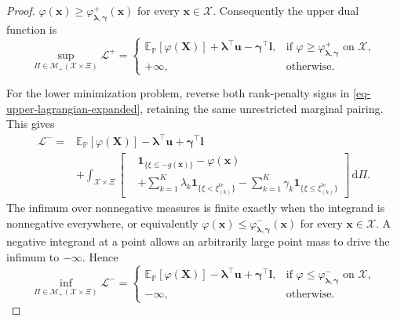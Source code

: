 \begin{proof}
  $\varphi(\bm x)\ge\varphi^+_{\bm\lambda,\bm\gamma}(\bm x)$ for every $\bm x\in\mathcal X$. Consequently the upper dual function is
  \begin{equation}
    \sup_{\Pi\in\mathcal M_+(\mathcal X\times\Xi)}\mathcal L^+
    =\begin{cases}
      \mathbb E_{\mathbb P}\left[\varphi(\bm X)\right]
        +\bm\lambda^\top\bm u-\bm\gamma^\top\bm l,
        &\text{if }\varphi\ge\varphi^+_{\bm\lambda,\bm\gamma}\text{ on }\mathcal X,\\
      +\infty,&\text{otherwise}.
    \end{cases}
    \label{eq-upper-dual-function}
  \end{equation}

  For the lower minimization problem, reverse both rank-penalty signs in \eqref{eq-upper-lagrangian-expanded}, retaining the same unrestricted marginal pairing. This gives
  \begin{equation}
    \begin{aligned}
      \mathcal L^-={}&\mathbb E_{\mathbb P}\left[\varphi(\bm X)\right]
        -\bm\lambda^\top\bm u+\bm\gamma^\top\bm l\\
      &+\int_{\mathcal X\times\Xi}\left[
        \begin{aligned}
          &\mathbf1_{\{\xi\le-\hat g(\bm x)\}}-\varphi(\bm x)\\
          &+\sum_{k=1}^K\lambda_k\mathbf1_{\{\xi<\xi_{(k)}^{\mathrm{te}}\}}
          -\sum_{k=1}^K\gamma_k\mathbf1_{\{\xi\le\xi_{(k)}^{\mathrm{te}}\}}
        \end{aligned}\right]\,\mathrm d\Pi.
    \end{aligned}
    \label{eq-lower-lagrangian}
  \end{equation}
  The infimum over nonnegative measures is finite exactly when the integrand is nonnegative everywhere, or equivalently
  $\varphi(\bm x)\le\varphi^-_{\bm\lambda,\bm\gamma}(\bm x)$ for every $\bm x\in\mathcal X$. A negative integrand at a point allows an arbitrarily large point mass to drive the infimum to $-\infty$. Hence
  \begin{equation}
    \inf_{\Pi\in\mathcal M_+(\mathcal X\times\Xi)}\mathcal L^-
    =\begin{cases}
      \mathbb E_{\mathbb P}\left[\varphi(\bm X)\right]
        -\bm\lambda^\top\bm u+\bm\gamma^\top\bm l,
        &\text{if }\varphi\le\varphi^-_{\bm\lambda,\bm\gamma}\text{ on }\mathcal X,\\
      -\infty,&\text{otherwise}.
    \end{cases}
    \label{eq-lower-dual-function}
  \end{equation}


\end{proof}
